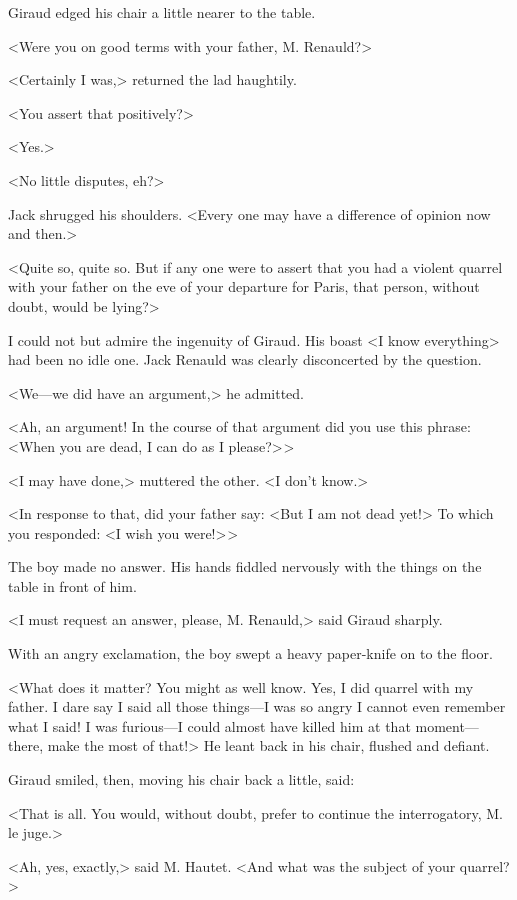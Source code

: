  Giraud edged his chair a little nearer to the table. 

 <Were you on good terms with your father, M. Renauld?> 

 <Certainly I was,> returned the lad haughtily. 

 <You assert that positively?> 

 <Yes.> 

 <No little disputes, eh?> 

 Jack shrugged his shoulders. <Every one may have a difference of opinion now and then.> 

 <Quite so, quite so. But if any one were to assert that you had a violent quarrel with your father on the eve of your departure for Paris, that person, without doubt, would be lying?> 

 I could not but admire the ingenuity of Giraud. His boast <I know everything> had been no idle one. Jack Renauld was clearly disconcerted by the question. 

 <We—we did have an argument,> he admitted. 

 <Ah, an argument! In the course of that argument did you use this phrase: <When you are dead, I can do as I please?> > 

 <I may have done,> muttered the other. <I don't know.> 

 <In response to that, did your father say: <But I am not dead yet!> To which you responded: <I wish you were!> > 

 The boy made no answer. His hands fiddled nervously with the things on the table in front of him. 

 <I must request an answer, please, M. Renauld,> said Giraud sharply. 

 With an angry exclamation, the boy swept a heavy paper-knife on to the floor. 

 <What does it matter? You might as well know. Yes, I did quarrel with my father. I dare say I said all those things—I was so angry I cannot even remember what I said! I was furious—I could almost have killed him at that moment—there, make the most of that!> He leant back in his chair, flushed and defiant. 

 Giraud smiled, then, moving his chair back a little, said: 

 <That is all. You would, without doubt, prefer to continue the interrogatory, M. le juge.> 

 <Ah, yes, exactly,> said M. Hautet. <And what was the subject of your quarrel?> 

